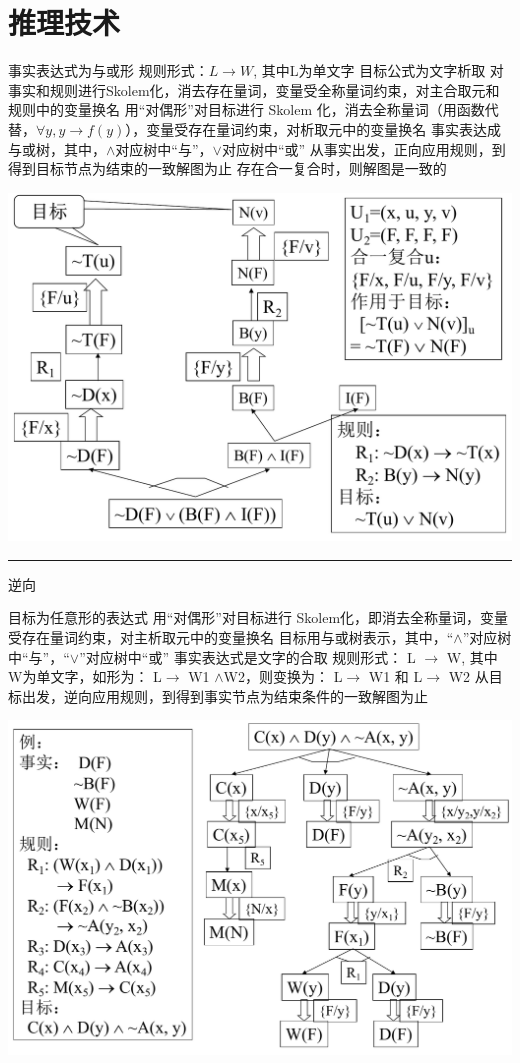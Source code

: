 \documentclass[twocolumn,zihao=5,linespread=1,heading=false,autoindent=0pt]{ctexart}
\newcommand{\HRule}[1][\medskipamount]{\par
  \vspace*{\dimexpr-\parskip-\baselineskip+#1}
  \noindent\rule{\linewidth}{0.2mm}\par
  \vspace*{\dimexpr-\parskip-.5\baselineskip+#1}}
\theoremstyle{exampstyle} \newtheorem{definition}{定义}[section]
\theoremstyle{exampstyle} \newtheorem{example}{例}[section]
\theoremstyle{exampstyle} \newtheorem{theorem}{定理}[section]
\theoremstyle{exampstyle} \newtheorem{lemma}{引理}[section]
\theoremstyle{exampstyle} \newtheorem{myproof}{证明}[section]
\begin{document}
\section{推理技术}
\begin{multicols}{2}
    \begin{outline}[citemize]
        \1 事实表达式为与或形
        \1 规则形式：$L \to W$, 其中L为单文字
        \1 目标公式为文字析取
        \1 对事实和规则进行Skolem化，消去存在量词，变量受全称量词约束，对主合取元和规则中的变量换名
        \1 用“对偶形”对目标进行 Skolem 化，消去全称量词（用函数代替，$\forall y, y \to f(y)$），变量受存在量词约束，对析取元中的变量换名
        \1 事实表达成与或树，其中，$\land$对应树中“与”，$\lor$对应树中“或”
        \1 从事实出发，正向应用规则，到得到目标节点为结束的一致解图为止
        \1 存在合一复合时，则解图是一致的
    \end{outline}    
\end{multicols}
\includegraphics[width=\linewidth]{forward.pdf}
\HRule
逆向
\begin{multicols}{2}
    \begin{outline}[citemize]
        \1 目标为任意形的表达式
        \1 用“对偶形”对目标进行 Skolem化，即消去全称量词，变量受存在量词约束，对主析取元中的变量换名
        \1 目标用与或树表示，其中，“$\land$”对应树中“与”，“$\lor$”对应树中“或”
        \1 事实表达式是文字的合取
        \1 规则形式： L $\to$ W, 其中W为单文字，如形为：   	L$\to$ W1 $\land$W2，则变换为：      		        			L$\to$ W1 和 L$\to$ W2
        \1 从目标出发，逆向应用规则，到得到事实节点为结束条件的一致解图为止
    \end{outline}
\end{multicols}
\begin{center}
    \includegraphics[width=.8\linewidth]{backward.pdf}
\end{center}

\end{document}
